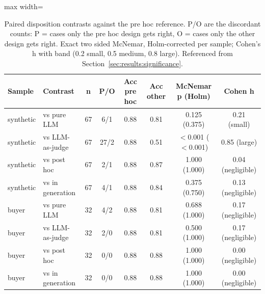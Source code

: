 \begin{table}[htbp]
\centering
\caption{Paired disposition contrasts against the pre hoc reference. P/O are the discordant counts: P = cases only the pre hoc design gets right, O = cases only the other design gets right. Exact two sided McNemar, Holm-corrected per sample; Cohen's h with band (0.2 small, 0.5 medium, 0.8 large). Referenced from Section~\ref{sec:results:significance}.}
\label{tab:results:significance}
\footnotesize
\begin{adjustbox}{max width=\textwidth}
\begin{tabular}{@{}llcccccc@{}}
\toprule
\textbf{Sample} & \textbf{Contrast} & \textbf{n} & \textbf{P/O} & \textbf{Acc pre hoc} & \textbf{Acc other} & \textbf{McNemar p (Holm)} & \textbf{Cohen h} \\
\midrule
synthetic & vs pure LLM      & 67 & 6/1  & 0.88 & 0.81 & 0.125 (0.375)       & 0.21 (small) \\
synthetic & vs LLM-as-judge  & 67 & 27/2 & 0.88 & 0.51 & $<$0.001 ($<$0.001) & 0.85 (large) \\
synthetic & vs post hoc      & 67 & 2/1  & 0.88 & 0.87 & 1.000 (1.000)       & 0.04 (negligible) \\
synthetic & vs in generation & 67 & 4/1  & 0.88 & 0.84 & 0.375 (0.750)       & 0.13 (negligible) \\
\midrule
buyer     & vs pure LLM      & 32 & 4/2  & 0.88 & 0.81 & 0.688 (1.000)       & 0.17 (negligible) \\
buyer     & vs LLM-as-judge  & 32 & 2/0  & 0.88 & 0.81 & 0.500 (1.000)       & 0.17 (negligible) \\
buyer     & vs post hoc      & 32 & 0/0  & 0.88 & 0.88 & 1.000 (1.000)       & 0.00 (negligible) \\
buyer     & vs in generation & 32 & 0/0  & 0.88 & 0.88 & 1.000 (1.000)       & 0.00 (negligible) \\
\bottomrule
\end{tabular}
\end{adjustbox}
\end{table}

